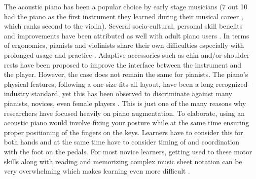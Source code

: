 \documentclass[sigchi, review]{acmart}
\begin{document}
The acoustic piano has been a popular choice by early stage musicians (7 out 10 had the piano as the first instrument they learned during their musical career \cite{sloboda1992transitions}, which ranks second to the violin). Several socio-cultural, personal skill benefits and improvements have been attributed as well with adult piano users \cite{jutras2006benefits}. In terms of ergonomics, pianists and violinists share their own difficulties especially with prolonged usage and practice \cite{chi2020ergonomics}. Adaptive accessories such as chin and/or shoulder rests have been proposed to improve the interface between the instrument and the player. However, the case does not remain the same for pianists. The piano's physical features, following a one-size-fits-all layout, have been a long recognized-industry standard, yet this has been observed to discriminate against many pianists, novices, even female players \cite{boyle2012experience}. This is just one of the many reasons why researchers have focused heavily on piano augmentation. To elaborate, using an acoustic piano would involve fixing your posture while at the same time ensuring proper positioning of the fingers on the keys. Learners have to consider this for both hands and at the same time have to consider timing of and coordination with the foot on the pedals. For most novice learners, getting used to these motor skills along with reading and memorizing complex music sheet notation can be very overwhelming which makes learning even more difficult \cite{highben2004effects}. 

\end{document}
